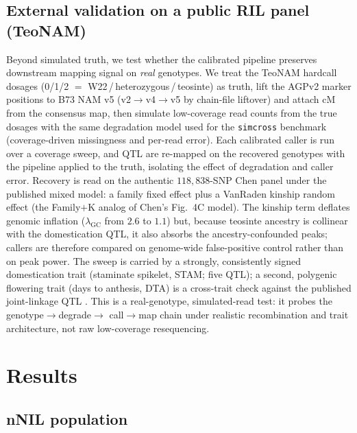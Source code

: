 \documentclass[9pt,twocolumn,twoside]{rilabRxiv}
\begin{document}
\subsection{External validation on a public RIL panel (TeoNAM)}
Beyond simulated truth, we test whether the calibrated pipeline preserves
downstream mapping signal on \emph{real} genotypes. We treat the TeoNAM hardcall
dosages (0/1/2 $=$ W22\,/\,heterozygous\,/\,teosinte) as truth, lift the AGPv2
marker positions to B73 NAM v5 (v2$\rightarrow$v4$\rightarrow$v5 by chain-file
liftover) and attach cM from the consensus map, then simulate low-coverage read
counts from the true dosages with the same degradation model used for the
\texttt{simcross} benchmark (coverage-driven missingness and per-read error). Each
calibrated caller is run over a coverage sweep, and QTL are re-mapped on the
recovered genotypes with the pipeline applied to the truth, isolating the effect
of degradation and caller error. Recovery is read on the authentic
$118{,}838$-SNP Chen panel under the published mixed model: a family fixed
effect plus a VanRaden kinship random effect (the Family$+$K analog of Chen's
Fig.~4C model). The kinship term deflates genomic inflation
($\lambda_{\mathrm{GC}}$ from $2.6$ to $1.1$) but, because teosinte ancestry is
collinear with the domestication QTL, it also absorbs the ancestry-confounded
peaks; callers are therefore compared on genome-wide false-positive control rather
than on peak power. The sweep is carried by a strongly, consistently signed
domestication trait (staminate spikelet, STAM; five QTL); a second, polygenic
flowering trait (days to anthesis, DTA) is a cross-trait check against the
published joint-linkage QTL \citep{chen2019teonam}. This is a real-genotype,
simulated-read test: it probes the genotype$\rightarrow$degrade$\rightarrow$
call$\rightarrow$map chain under realistic recombination and trait architecture,
not raw low-coverage resequencing.




\section{Results}
\subsection{nNIL population}
\end{document}
